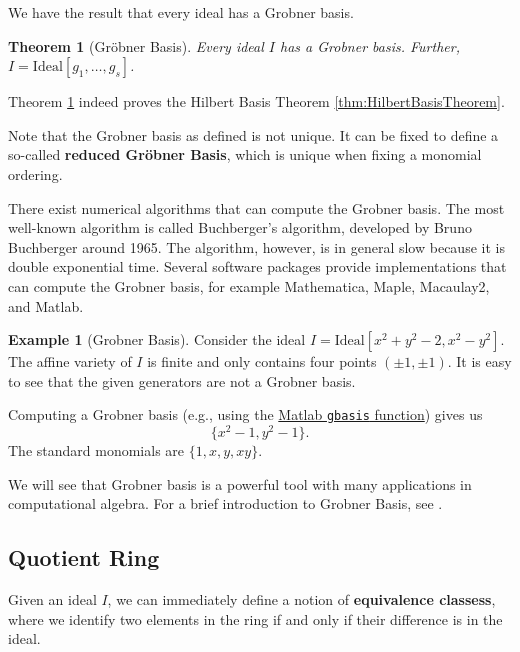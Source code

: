 \documentclass[
]{book}
\newtheorem{theorem}{Theorem}[chapter]
\theoremstyle{definition}
\theoremstyle{definition}
\newtheorem{example}{Example}[chapter]
\theoremstyle{definition}
\theoremstyle{definition}
\theoremstyle{remark}
\begin{document}
We have the result that every ideal has a Grobner basis.

\begin{theorem}[Gröbner Basis]
\protect\hypertarget{thm:GrobnerBasis}{}\label{thm:GrobnerBasis}Every ideal \(I\) has a Grobner basis. Further, \(I = \mathrm{Ideal}[g_1,\dots,g_s]\).
\end{theorem}

Theorem \ref{thm:GrobnerBasis} indeed proves the Hilbert Basis Theorem \ref{thm:HilbertBasisTheorem}.

Note that the Grobner basis as defined is not unique. It can be fixed to define a so-called \textbf{reduced Gröbner Basis}, which is unique when fixing a monomial ordering.

There exist numerical algorithms that can compute the Grobner basis. The most well-known algorithm is called Buchberger's algorithm, developed by Bruno Buchberger around 1965. The algorithm, however, is in general slow because it is double exponential time. Several software packages provide implementations that can compute the Grobner basis, for example Mathematica, Maple, Macaulay2, and Matlab.

\begin{example}[Grobner Basis]
\protect\hypertarget{exm:GrobnerBasis}{}\label{exm:GrobnerBasis}Consider the ideal \(I = \mathrm{Ideal}[x^2+y^2-2, x^2 - y^2]\). The affine variety of \(I\) is finite and only contains four points \((\pm 1, \pm 1)\). It is easy to see that the given generators are not a Grobner basis.

Computing a Grobner basis (e.g., using the \href{https://www.mathworks.com/help/symbolic/sym.gbasis.html}{Matlab \texttt{gbasis} function}) gives us
\[
\{ x^2 - 1, y^2 - 1 \}.
\]
The standard monomials are \(\{ 1,x,y,xy \}\).
\end{example}

We will see that Grobner basis is a powerful tool with many applications in computational algebra. For a brief introduction to Grobner Basis, see \citep{sturmfels05notes-grobner}.

\subsection{Quotient Ring}\label{quotient-ring}

Given an ideal \(I\), we can immediately define a notion of \textbf{equivalence classess}, where we identify two elements in the ring if and only if their difference is in the ideal.
\end{document}
